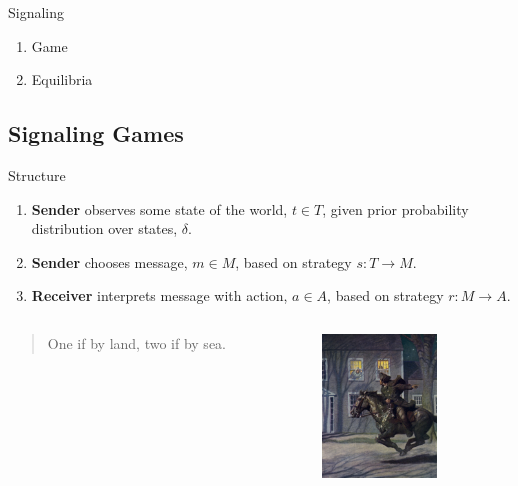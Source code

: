 \documentclass[compress]{beamer}
\begin{document}
\begin{frame}{Signaling}
      \begin{enumerate}
           \item Game
	   \item Equilibria
      \end{enumerate}
\end{frame}


\subsection{Signaling Games}

\begin{frame}{Structure}
\begin{block}{}
\begin{enumerate}
     \item \textbf{Sender} observes some state of the world, $t \in T$, given prior probability distribution over states, $\delta$.
     \item \textbf{Sender} chooses message, $m \in M$, based on strategy $s: T \rightarrow M$.
     \item \textbf{Receiver} interprets message with action, $a \in A$, based on strategy $r : M \rightarrow A$.
\end{enumerate}
\end{block}
\end{frame}


\begin{frame}{\cite{lewis:1969}}
\begin{columns}[T]  
   \begin{column}{.5\textwidth}
      \begin{block}{}
      \begin{quote}
	   One if by land, two if by sea.
      \end{quote}           
      \end{block}
    \end{column}
   \begin{column}{.4\textwidth}
	  \includegraphics[height=1.5in]{revere.png}   
   \end{column}
  \end{columns}
\end{frame}
\end{document}
